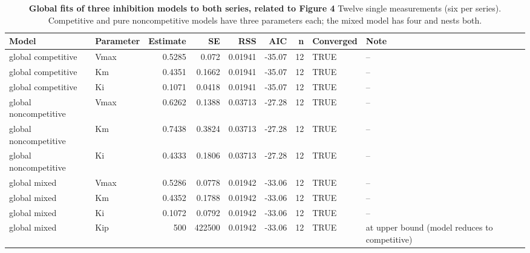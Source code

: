 \documentclass[9pt,twocolumn]{extarticle}
\begin{document}
\begin{table}[h]
\caption{\textbf{Global fits of three inhibition models to both series, related to Figure 4}\newline
Twelve single measurements (six per series). Competitive and pure noncompetitive models have three parameters each; the mixed model has four and nests both.}
\footnotesize
\begin{tabular}{@{}llrrrrrll@{}}
\toprule
Model & Parameter & Estimate & SE & RSS & AIC & n & Converged & Note \\
\midrule
global competitive & Vmax & 0.5285 & 0.072 & 0.01941 & -35.07 & 12 & TRUE & – \\
global competitive & Km & 0.4351 & 0.1662 & 0.01941 & -35.07 & 12 & TRUE & – \\
global competitive & Ki & 0.1071 & 0.0418 & 0.01941 & -35.07 & 12 & TRUE & – \\
global noncompetitive & Vmax & 0.6262 & 0.1388 & 0.03713 & -27.28 & 12 & TRUE & – \\
global noncompetitive & Km & 0.7438 & 0.3824 & 0.03713 & -27.28 & 12 & TRUE & – \\
global noncompetitive & Ki & 0.4333 & 0.1806 & 0.03713 & -27.28 & 12 & TRUE & – \\
global mixed & Vmax & 0.5286 & 0.0778 & 0.01942 & -33.06 & 12 & TRUE & – \\
global mixed & Km & 0.4352 & 0.1788 & 0.01942 & -33.06 & 12 & TRUE & – \\
global mixed & Ki & 0.1072 & 0.0792 & 0.01942 & -33.06 & 12 & TRUE & – \\
global mixed & Kip & 500 & 422500 & 0.01942 & -33.06 & 12 & TRUE & at upper bound (model reduces to competitive) \\
\bottomrule
\end{tabular}
\end{table}
\end{document}
